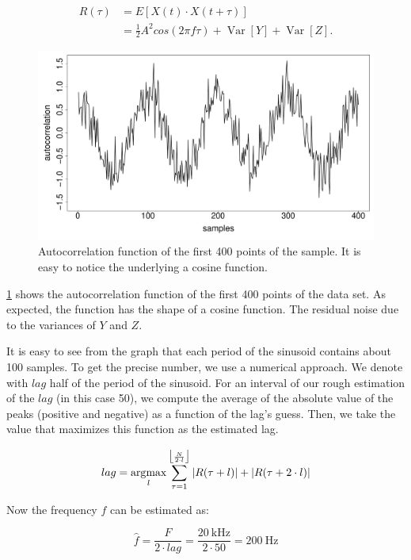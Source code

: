 \begin{equation}
    \begin{split}
    R(\tau) &= E[X(t)\cdot X(t+\tau)] \\
            &= \frac{1}{2} A^2 cos(2\pi f\tau) +  \operatorname{Var}[Y] + \operatorname{Var}[Z].
    \end{split}
\end{equation}

\begin{figure}[t]
	\centering
	\includegraphics[width=\columnwidth]{figures/autocorrelation}
	\caption{Autocorrelation function of the first \num{400} points of the sample. It is easy to notice the underlying a cosine function.}
	\label{fig:autocorrelation}
\end{figure}

\cref{fig:autocorrelation} shows the autocorrelation function of the first \num{400} points of the data set.
As expected, the function has the shape of a cosine function.
The residual noise due to the variances of $Y$ and $Z$.

It is easy to see from the graph that each period of the sinusoid contains about \num{100} samples.
To get the precise number, we use a numerical approach.
We denote with $lag$ half of the period of the sinusoid.
For an interval of our rough estimation of the $lag$ (in this case \num{50}), we compute the average of the absolute value of the peaks (positive and negative) as a function of the lag's guess.
Then, we take the value that maximizes this function as the estimated lag.

\begin{equation*}
    lag = \operatorname*{arg\!\max}_{l} \sum_{\tau=1}^{\big\lfloor \frac{N}{2 \cdot l} \big\rfloor} |R(\tau + l)| + |R(\tau + 2 \cdot l)|
\end{equation*}

Now the frequency $f$ can be estimated as:

\begin{equation*}
    \hat{f} = \frac{F}{2 \cdot lag} = \frac{\SI{20}{\kilo\hertz}}{2 \cdot 50} = \SI{200}{\hertz}
\end{equation*}
